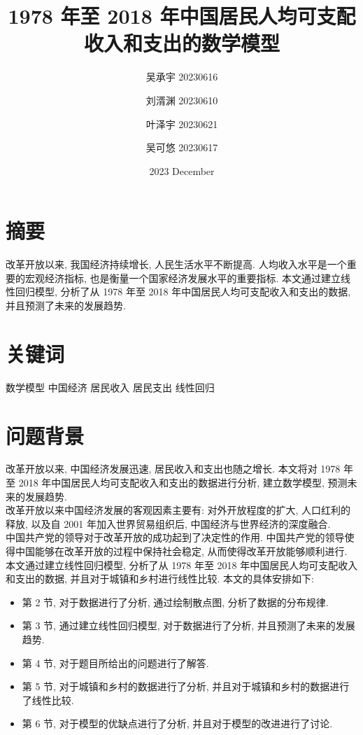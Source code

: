 \documentclass{article}
\title{1978 年至 2018 年中国居民人均可支配收入和支出的数学模型}
\author{吴承宇 20230616 \and 刘湑渊 20230610 \and 叶泽宇 20230621 \and 吴可悠 20230617}
\date{2023 December}
\begin{document}
\maketitle
\section*{摘要}
\begin{mdframed}
\fangsong
改革开放以来, 我国经济持续增长, 人民生活水平不断提高. 人均收入水平是一个重要的宏观经济指标, 也是衡量一个国家经济发展水平的重要指标. 本文通过建立线性回归模型, 分析了从 1978 年至 2018 年中国居民人均可支配收入和支出的数据, 并且预测了未来的发展趋势.\\
\end{mdframed}
\section*{关键词}
\begin{mdframed}
\fangsong
数学模型 \quad 中国经济 \quad 居民收入 \quad 居民支出 \quad 线性回归
\end{mdframed}
\section{问题背景}
改革开放以来, 中国经济发展迅速, 居民收入和支出也随之增长. 本文将对 1978 年至 2018 年中国居民人均可支配收入和支出的数据进行分析, 建立数学模型, 预测未来的发展趋势.\\
\indent 改革开放以来中国经济发展的客观因素主要有: 对外开放程度的扩大, 人口红利的释放, 以及自 2001 年加入世界贸易组织后, 中国经济与世界经济的深度融合.\\
\indent 中国共产党的领导对于改革开放的成功起到了决定性的作用. 中国共产党的领导使得中国能够在改革开放的过程中保持社会稳定, 从而使得改革开放能够顺利进行.\\
\indent 本文通过建立线性回归模型, 分析了从 1978 年至 2018 年中国居民人均可支配收入和支出的数据, 并且对于城镇和乡村进行线性比较. 本文的具体安排如下:
\begin{itemize}
    \item 第 2 节, 对于数据进行了分析, 通过绘制散点图, 分析了数据的分布规律.
    \item 第 3 节, 通过建立线性回归模型, 对于数据进行了分析, 并且预测了未来的发展趋势.
    \item 第 4 节, 对于题目所给出的问题进行了解答.
    \item 第 5 节, 对于城镇和乡村的数据进行了分析, 并且对于城镇和乡村的数据进行了线性比较.
    \item 第 6 节, 对于模型的优缺点进行了分析, 并且对于模型的改进进行了讨论.
\end{itemize}
\end{document}
